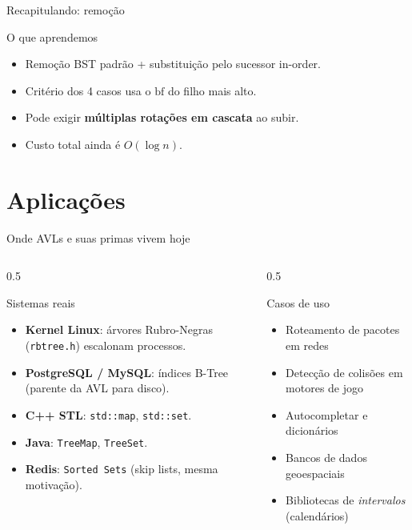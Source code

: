 \documentclass[aspectratio=169]{beamer}
\begin{document}
\begin{frame}{Recapitulando: remoção}
  \begin{block}{O que aprendemos}
    \begin{itemize}
      \item Remoção BST padrão + substituição pelo sucessor in-order.
      \item Critério dos 4 casos usa o $\mathrm{bf}$ do filho mais alto.
      \item Pode exigir \textbf{múltiplas rotações em cascata} ao subir.
      \item Custo total ainda é $O(\log n)$.
    \end{itemize}
  \end{block}
\end{frame}

\section{Aplicações}

\begin{frame}{Onde AVLs e suas primas vivem hoje}
  \begin{columns}[T]
    \begin{column}{0.5\textwidth}
      \begin{block}{Sistemas reais}
        \begin{itemize}
          \item \textbf{Kernel Linux}: árvores Rubro-Negras
                (\texttt{rbtree.h}) escalonam processos.
          \item \textbf{PostgreSQL / MySQL}: índices B-Tree
                (parente da AVL para disco).
          \item \textbf{C++ STL}: \texttt{std::map}, \texttt{std::set}.
          \item \textbf{Java}: \texttt{TreeMap}, \texttt{TreeSet}.
          \item \textbf{Redis}: \texttt{Sorted Sets} (skip lists,
                mesma motivação).
        \end{itemize}
      \end{block}
    \end{column}
    \begin{column}{0.5\textwidth}
      \begin{exampleblock}{Casos de uso}
        \begin{itemize}
          \item Roteamento de pacotes em redes
          \item Detecção de colisões em motores de jogo
          \item Autocompletar e dicionários
          \item Bancos de dados geoespaciais
          \item Bibliotecas de \emph{intervalos} (calendários)
        \end{itemize}
      \end{exampleblock}
    \end{column}
  \end{columns}
\end{frame}
\end{document}
